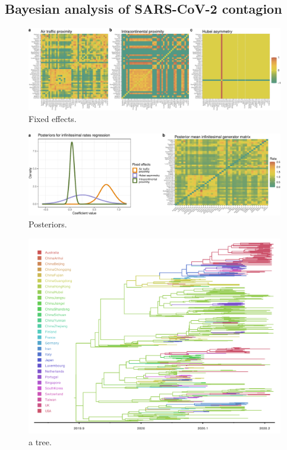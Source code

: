 \documentclass[12pt]{article} %
\begin{document}
\subsection{Bayesian analysis of SARS-CoV-2 contagion}\label{sec:sars}

\begin{figure}[!t]
	\centering
	\includegraphics[width=\linewidth]{fixedEffects.pdf}
	\caption{Fixed effects.}\label{fig:FE}
\end{figure}

\begin{figure}[!t]
	\centering
	\includegraphics[width=\linewidth]{postViz.pdf}
	\caption{Posteriors.}\label{fig:post}
\end{figure}

\begin{figure}[!t]
	\centering
	\includegraphics[width=0.8\linewidth]{summary.tree.pdf}
	\caption{a tree.}\label{fig:tree}
\end{figure}
\end{document}
